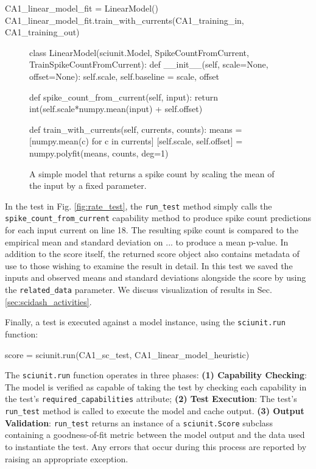 \documentclass[11pt,letterpaper]{article}
\let\verbx\lstinline
\begin{document}
\begin{python}
CA1_linear_model_fit = LinearModel()
CA1_linear_model_fit.train_with_currents(CA1_training_in, CA1_training_out)
\end{python}
\begin{figure}
\begin{python}
class LinearModel(sciunit.Model, SpikeCountFromCurrent, 
    TrainSpikeCountFromCurrent):
  def __init__(self, scale=None, offset=None): 
    self.scale, self.baseline = scale, offset
    
  def spike_count_from_current(self, input):
    return int(self.scale*numpy.mean(input) + self.offset)

  def train_with_currents(self, currents, counts):
    means = [numpy.mean(c) for c in currents]
    [self.scale, self.offset] = numpy.polyfit(means, counts, deg=1)    
\end{python}
\caption{A simple model that returns a spike count by scaling the mean of the input by a fixed parameter.}
\label{fig:simple_model}
\end{figure}
In the test in Fig. \ref{fig:rate_test}, the \verbx{run_test} method simply calls the \verbx{spike_count_from_current} capability method  to produce spike count predictions for each input current on line 18. The resulting spike count is compared to the empirical mean and standard deviation on ... to produce a mean p-value. In addition to the score itself, the returned score object also contains metadata of use to those wishing to examine the result in detail. In this test we saved the inputs and observed means and standard deviations alongside the score by using the \verbx{related_data} parameter. We discuss visualization of results in Sec. \ref{sec:scidash_activities}.

Finally, a test is executed against a model instance, using the \verbx{sciunit.run} function:
\begin{python}
score = sciunit.run(CA1_sc_test, CA1_linear_model_heuristic)
\end{python}

The \verbx{sciunit.run} function operates in three phases: \textbf{(1) Capability Checking}: The model is verified as capable of taking the test by checking each capability in the test's \verbx{required_capabilities} attribute; \textbf{(2) Test Execution}: The test's \verbx{run_test} method is called to execute the model and cache output. \textbf{(3) Output Validation}: \verbx{run_test} returns an instance of a \verbx{sciunit.Score} subclass containing a goodness-of-fit metric between the model output and the data used to instantiate the test.  Any errors that occur during this process are reported by raising an appropriate exception.
\end{document}
